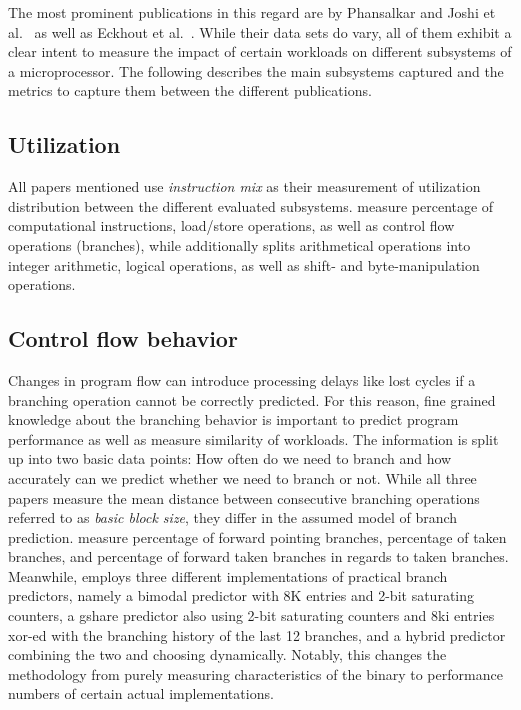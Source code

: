 \documentclass[../bachelor_paper.tex]{subfiles}
\begin{document}
The most prominent publications in this regard are by Phansalkar and Joshi et al.\ \cite{phansalkarMeasuringProgramSimilarity2005,joshiMeasuringBenchmarkSimilarity2006} as well as Eckhout et al.\ \cite{eeckhoutQuantifyingImpactInput2003}. While their data sets do vary, all of them exhibit a clear intent to measure the impact of certain workloads on different subsystems of a microprocessor. The following describes the main subsystems captured and the metrics to capture them between the different publications.

\subsection{Utilization}
All papers mentioned use \emph{instruction mix} as their measurement of utilization distribution between the different evaluated subsystems. \cite{phansalkarMeasuringProgramSimilarity2005,joshiMeasuringBenchmarkSimilarity2006} measure percentage of computational instructions, load/store operations, as well as control flow operations (branches), while \cite{eeckhoutQuantifyingImpactInput2003} additionally splits arithmetical operations into integer arithmetic, logical operations, as well as shift- and byte-manipulation operations.

\subsection{Control flow behavior}
Changes in program flow can introduce processing delays like lost cycles if a branching operation cannot be correctly predicted. For this reason, fine grained knowledge about the branching behavior is important to predict program performance as well as measure similarity of workloads. The information is split up into two basic data points: How often do we need to branch and how accurately can we predict whether we need to branch or not. While all three papers measure the mean distance between consecutive branching operations referred to as \emph{basic block size}, they differ in the assumed model of branch prediction. \cite{phansalkarMeasuringProgramSimilarity2005,joshiMeasuringBenchmarkSimilarity2006} measure percentage of forward pointing branches, percentage of taken branches, and percentage of forward taken branches in regards to taken branches. Meanwhile, \cite{eeckhoutQuantifyingImpactInput2003} employs three different implementations of practical branch predictors, namely a bimodal predictor with 8K entries and 2-bit saturating counters, a gshare predictor also using 2-bit saturating counters and 8ki entries xor-ed with the branching history of the last 12 branches, and a hybrid predictor combining the two and choosing dynamically. Notably, this changes the methodology from purely measuring characteristics of the binary to performance numbers of certain actual implementations.
\end{document}
